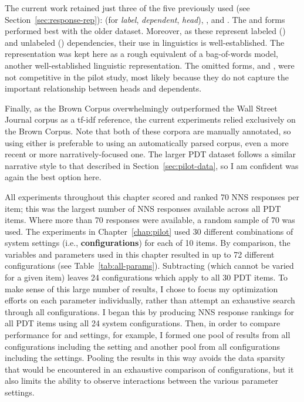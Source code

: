 The current work retained just three of the five  previously used (see Section~\ref{sec:response-rep}):  (for \textit{label}, \textit{dependent}, \textit{head}), , and . The  and  forms performed best with the older dataset. Moreover, as these represent labeled () and unlabeled () dependencies, their use in linguistics is well-established. The  representation was kept here as a rough equivalent of a bag-of-words model, another well-established linguistic representation. The omitted forms,  and , were not competitive in the pilot study, most likely because they do not capture the important relationship between heads and dependents.

Finally, as the Brown Corpus overwhelmingly outperformed the Wall Street Journal corpus as a tf-idf reference, the current experiments relied exclusively on the Brown Corpus. Note that both of these corpora are manually annotated, so using either is preferable to using an automatically parsed corpus, even a more recent or more narratively-focused one. The larger PDT dataset follows a similar narrative style to that described in Section~\ref{sec:pilot-data}, so I am confident  was again the best option here.

All experiments throughout this chapter scored and ranked 70 NNS responses per item; this was the largest number of NNS responses available across all PDT items. Where more than 70 responses were available, a random sample of 70 was used.
The experiments in Chapter~\ref{chap:pilot} used 30 different combinations of system settings (i.e., \textbf{configurations}) for each of 10 items. By comparison, the variables and parameters used in this chapter resulted in up to 72 different configurations (see Table~\ref{tab:all-params}). Subtracting  (which cannot be varied for a given item) leaves 24 configurations which apply to all 30 PDT items. To make sense of this large number of results, I chose to focus my optimization efforts on each parameter individually, rather than attempt an exhaustive search through all configurations. I began this by producing NNS response rankings for all PDT items using all 24 system configurations. Then, in order to compare performance for  and  settings, for example, I formed one pool of results from all configurations including the  setting and another pool from all configurations including the  settings. Pooling the results in this way avoids the data sparsity that would be encountered in an exhaustive comparison of configurations, but it also limits the ability to observe interactions between the various parameter settings.


